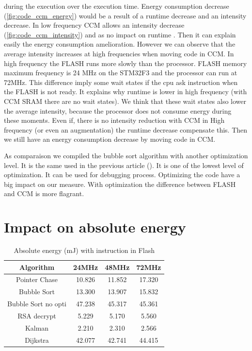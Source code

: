 \documentclass[conference]{IEEEtran}
\begin{document}
during the execution over the execution time. Energy consumption decrease
(\ref{fig:code_ccm_energy}) would be a result of a runtime decrease and an
intensity decrease. In low frequency CCM allows an intensity decrease
(\ref{fig:code_ccm_intensity}) and as no impact on runtime \cite{mem_alloc}.
Then it can explain easily the energy consumption amelioration. However we can
observe that the average intensity increases at high frequencies when moving
code in CCM. In high frequency the FLASH runs more slowly than the processor.
FLASH memory  maximum frequency is 24 MHz on the STM32F3 and the processor can
run at 72MHz. This difference imply some wait states if the cpu ask instruction
when the FLASH is not ready. It explains why runtime is lower in high frequency
(with CCM SRAM there are no wait states). We think that these wait states also
lower the average intensity, because the processor does not consume energy
during these moments. Even if, there is no intensity reduction with CCM in High
frequency (or even an augmentation) the runtime decrease compensate this. Then
we still have an energy consumption decrease by moving code in CCM.

As comparaison we compiled the bubble sort algorithm with another optimization
level. It is the same used in the previous article (\cite{mem_alloc}). It is one
of the lowest level of optimization. It can be used for debugging process.
Optimizing the code have a big impact on our measure. With optimization the
difference between FLASH and CCM is more flagrant. 

\section{Impact on absolute energy}


\begin{table}[h!]
\centering
\begin{tabular}{||c c c c||} 
 \hline
 Algorithm & 24MHz & 48MHz & 72MHz \\ [0.5ex] \hline\hline
 Pointer Chase & 10.826 & 11.852 & 17.320 \\ 
 Bubble Sort & 13.300 & 13.907 & 15.832 \\
 Bubble Sort no opti & 47.238 & 45.317 & 45.361 \\
 RSA decrypt & 5.229 & 5.170 & 5.560 \\
 Kalman & 2.210 & 2.310 & 2.566 \\
 Dijkstra & 42.077 & 42.741 & 44.415 \\[1ex] 
 \hline
\end{tabular}
\caption{Absolute energy (mJ) with instruction in Flash}
\label{energy_tab_code_flash}
\end{table}
\end{document}
